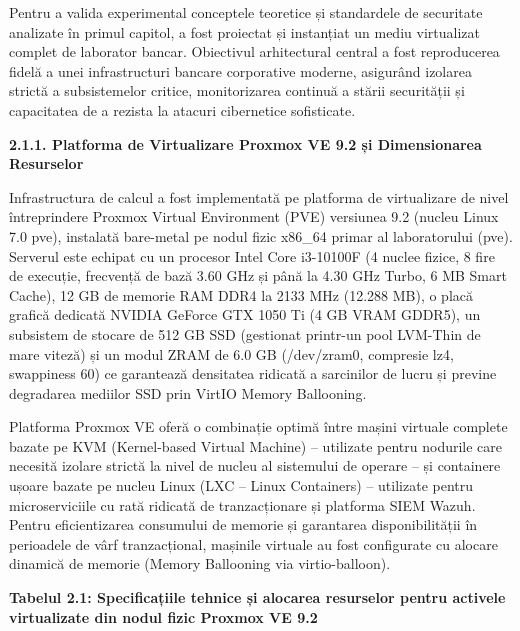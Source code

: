 \documentclass[
]{article}
\begin{document}
Pentru a valida experimental conceptele teoretice și standardele de
securitate analizate în primul capitol, a fost proiectat și instanțiat
un mediu virtualizat complet de laborator bancar. Obiectivul
arhitectural central a fost reproducerea fidelă a unei infrastructuri
bancare corporative moderne, asigurând izolarea strictă a subsistemelor
critice, monitorizarea continuă a stării securității și capacitatea de a
rezista la atacuri cibernetice sofisticate.

\textbf{2.1.1. Platforma de Virtualizare Proxmox VE 9.2 și Dimensionarea
Resurselor}

Infrastructura de calcul a fost implementată pe platforma de
virtualizare de nivel întreprindere Proxmox Virtual Environment (PVE)
versiunea 9.2 (nucleu Linux 7.0 pve), instalată bare-metal pe nodul
fizic x86\_64 primar al laboratorului (pve). Serverul este echipat cu un
procesor Intel Core i3-10100F (4 nuclee fizice, 8 fire de execuție,
frecvență de bază 3.60 GHz și până la 4.30 GHz Turbo, 6 MB Smart Cache),
12 GB de memorie RAM DDR4 la 2133 MHz (12.288 MB), o placă grafică
dedicată NVIDIA GeForce GTX 1050 Ti (4 GB VRAM GDDR5), un subsistem de
stocare de 512 GB SSD (gestionat printr-un pool LVM-Thin de mare viteză)
și un modul ZRAM de 6.0 GB (/dev/zram0, compresie lz4, swappiness 60) ce
garantează densitatea ridicată a sarcinilor de lucru și previne
degradarea mediilor SSD prin VirtIO Memory Ballooning.

Platforma Proxmox VE oferă o combinație optimă între mașini virtuale
complete bazate pe KVM (Kernel-based Virtual Machine) -- utilizate
pentru nodurile care necesită izolare strictă la nivel de nucleu al
sistemului de operare -- și containere ușoare bazate pe nucleu Linux
(LXC -- Linux Containers) -- utilizate pentru microserviciile cu rată
ridicată de tranzacționare și platforma SIEM Wazuh. Pentru
eficientizarea consumului de memorie și garantarea disponibilității în
perioadele de vârf tranzacțional, mașinile virtuale au fost configurate
cu alocare dinamică de memorie (Memory Ballooning via virtio-balloon).

\textbf{Tabelul 2.1: Specificațiile tehnice și alocarea resurselor
pentru activele virtualizate din nodul fizic Proxmox VE 9.2}
\end{document}
